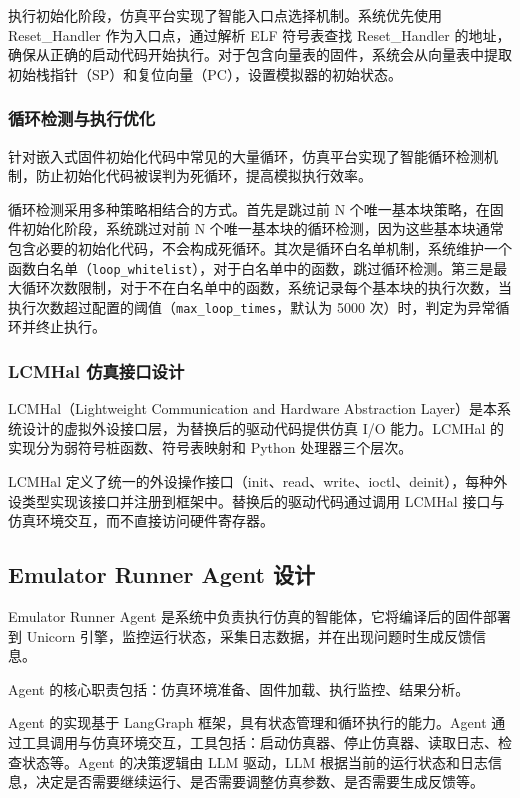 执行初始化阶段，仿真平台实现了智能入口点选择机制。系统优先使用 Reset\_Handler 作为入口点，通过解析 ELF 符号表查找 Reset\_Handler 的地址，确保从正确的启动代码开始执行。对于包含向量表的固件，系统会从向量表中提取初始栈指针（SP）和复位向量（PC），设置模拟器的初始状态。

\subsubsection{循环检测与执行优化}

针对嵌入式固件初始化代码中常见的大量循环，仿真平台实现了智能循环检测机制，防止初始化代码被误判为死循环，提高模拟执行效率。

循环检测采用多种策略相结合的方式。首先是跳过前 N 个唯一基本块策略，在固件初始化阶段，系统跳过对前 N 个唯一基本块的循环检测，因为这些基本块通常包含必要的初始化代码，不会构成死循环。其次是循环白名单机制，系统维护一个函数白名单（\texttt{loop\_whitelist}），对于白名单中的函数，跳过循环检测。第三是最大循环次数限制，对于不在白名单中的函数，系统记录每个基本块的执行次数，当执行次数超过配置的阈值（\texttt{max\_loop\_times}，默认为 5000 次）时，判定为异常循环并终止执行。

\subsubsection{LCMHal 仿真接口设计}

LCMHal（Lightweight Communication and Hardware Abstraction Layer）是本系统设计的虚拟外设接口层，为替换后的驱动代码提供仿真 I/O 能力。LCMHal 的实现分为弱符号桩函数、符号表映射和 Python 处理器三个层次。

LCMHal 定义了统一的外设操作接口（init、read、write、ioctl、deinit），每种外设类型实现该接口并注册到框架中。替换后的驱动代码通过调用 LCMHal 接口与仿真环境交互，而不直接访问硬件寄存器。

\subsection{Emulator Runner Agent 设计}

Emulator Runner Agent 是系统中负责执行仿真的智能体，它将编译后的固件部署到 Unicorn 引擎，监控运行状态，采集日志数据，并在出现问题时生成反馈信息。

Agent 的核心职责包括：仿真环境准备、固件加载、执行监控、结果分析。

Agent 的实现基于 LangGraph 框架，具有状态管理和循环执行的能力。Agent 通过工具调用与仿真环境交互，工具包括：启动仿真器、停止仿真器、读取日志、检查状态等。Agent 的决策逻辑由 LLM 驱动，LLM 根据当前的运行状态和日志信息，决定是否需要继续运行、是否需要调整仿真参数、是否需要生成反馈等。

